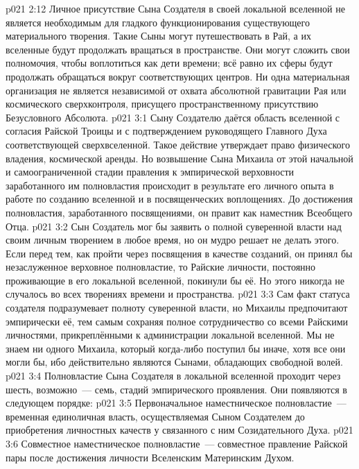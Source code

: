 \vs p021 2:12 Личное присутствие Сына Создателя в своей локальной вселенной не является необходимым для гладкого функционирования существующего материального творения. Такие Сыны могут путешествовать в Рай, а их вселенные будут продолжать вращаться в пространстве. Они могут сложить свои полномочия, чтобы воплотиться как дети времени; всё равно их сферы будут продолжать обращаться вокруг соответствующих центров. Ни одна материальная организация не является независимой от охвата абсолютной гравитации Рая или космического сверхконтроля, присущего пространственному присутствию Безусловного Абсолюта.
\vs p021 3:1 Сыну Создателю даётся область вселенной с согласия Райской Троицы и с подтверждением руководящего Главного Духа соответствующей сверхвселенной. Такое действие утверждает право физического владения, космической аренды. Но возвышение Сына Михаила от этой начальной и самоограниченной стадии правления к эмпирической верховности заработанного им полновластия происходит в результате его личного опыта в работе по созданию вселенной и в посвященческих воплощениях. До достижения полновластия, заработанного посвящениями, он правит как наместник Всеобщего Отца.
\vs p021 3:2 \pc Сын Создатель мог бы заявить о полной суверенной власти над своим личным творением в любое время, но он мудро решает не делать этого. Если перед тем, как пройти через посвящения в качестве созданий, он принял бы незаслуженное верховное полновластие, то Райские личности, постоянно проживающие в его локальной вселенной, покинули бы её. Но этого никогда не случалось во всех творениях времени и пространства.
\vs p021 3:3 Сам факт статуса создателя подразумевает полноту суверенной власти, но Михаилы предпочитают эмпирически  её, тем самым сохраняя полное сотрудничество со всеми Райскими личностями, прикреплёнными к администрации локальной вселенной. Мы не знаем ни одного Михаила, который когда\hyp{}либо поступил бы иначе, хотя все они могли бы, ибо действительно являются Сынами, обладающих свободной волей.
\vs p021 3:4 \pc Полновластие Сына Создателя в локальной вселенной проходит через шесть, возможно~--- семь, стадий эмпирического проявления. Они появляются в следующем порядке:
\vs p021 3:5 Первоначальное наместническое полновластие~--- временная единоличная власть, осуществляемая Сыном Создателем до приобретения личностных качеств у связанного с ним Созидательного Духа.
\vs p021 3:6 Совместное наместническое полновластие~--- совместное правление Райской пары после достижения личности Вселенским Материнским Духом.
